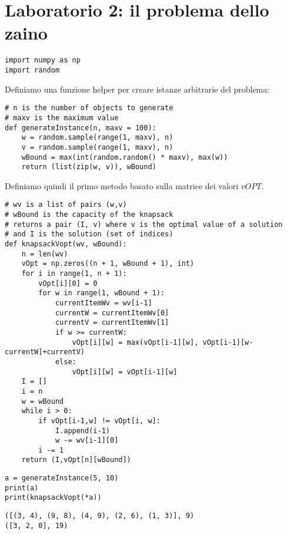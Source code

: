 \chapter{Laboratorio 2: il problema dello zaino}


\begin{verbatim}
import numpy as np
import random
\end{verbatim}


Definiamo una funzione helper per creare istanze arbitrarie del problema: 


\begin{verbatim}
# n is the number of objects to generate
# maxv is the maximum value
def generateInstance(n, maxv = 100):
    w = random.sample(range(1, maxv), n)
    v = random.sample(range(1, maxv), n)
    wBound = max(int(random.random() * maxv), max(w))
    return (list(zip(w, v)), wBound)
\end{verbatim}


Definiamo quindi il primo metodo basato sulla matrice dei valori $vOPT$. 

\begin{verbatim}
# wv is a list of pairs (w,v)
# wBound is the capacity of the knapsack
# returns a pair (I, v) where v is the optimal value of a solution
# and I is the solution (set of indices)
def knapsackVopt(wv, wBound):
    n = len(wv)
    vOpt = np.zeros((n + 1, wBound + 1), int)
    for i in range(1, n + 1):
        vOpt[i][0] = 0
        for w in range(1, wBound + 1):
            currentItemWv = wv[i-1]
            currentW = currentItemWv[0]
            currentV = currentItemWv[1]
            if w >= currentW:
                vOpt[i][w] = max(vOpt[i-1][w], vOpt[i-1][w-currentW]+currentV)
            else:
                vOpt[i][w] = vOpt[i-1][w]
    I = []
    i = n
    w = wBound
    while i > 0:
        if vOpt[i-1,w] != vOpt[i, w]:
            I.append(i-1)
            w -= wv[i-1][0]
        i -= 1
    return (I,vOpt[n][wBound])
\end{verbatim}



\begin{verbatim}
a = generateInstance(5, 10)
print(a)
print(knapsackVopt(*a))
\end{verbatim}
\begin{verbatim}
([(3, 4), (9, 8), (4, 9), (2, 6), (1, 3)], 9)
([3, 2, 0], 19)
\end{verbatim}



